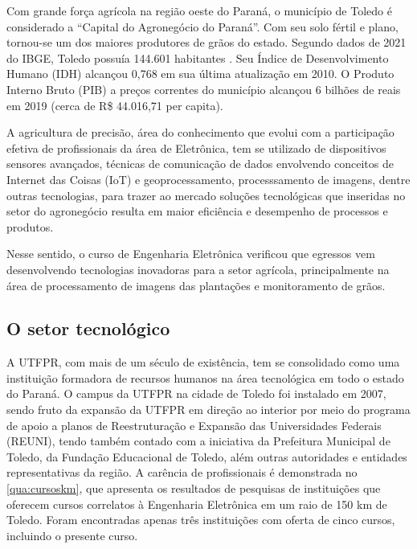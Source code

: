 Com grande força agrícola na região oeste do Paraná, o município de Toledo é considerado a ``Capital do Agronegócio do Paraná''. Com seu solo fértil e plano, tornou-se um dos maiores produtores de grãos do estado. Segundo dados de 2021 do IBGE, Toledo possuía 144.601 habitantes \cite{ibge2020}. Seu Índice de Desenvolvimento Humano (IDH) alcançou 0,768 em sua última atualização em 2010. O Produto Interno Bruto (PIB) a preços correntes do município alcançou 6 bilhões de reais em 2019 (cerca de R\$ 44.016,71 per capita). 


A agricultura de precisão, área do conhecimento que evolui com a participação efetiva de profissionais da área de Eletrônica, tem se utilizado de dispositivos sensores avançados, técnicas de comunicação de dados envolvendo conceitos de Internet das Coisas (IoT) e geoprocessamento, processsamento de imagens, dentre outras tecnologias, para trazer ao mercado soluções tecnológicas que inseridas no setor do agronegócio resulta em maior eficiência e desempenho de processos e produtos. 

Nesse sentido, o curso de Engenharia Eletrônica verificou que egressos vem desenvolvendo tecnologias inovadoras para a setor agrícola, principalmente na área de processamento de imagens das plantações e monitoramento de grãos.

\subsection{O setor tecnológico}

A UTFPR, com mais de um século de existência, tem se consolidado como uma instituição formadora de recursos humanos na área tecnológica em todo o estado do Paraná. O campus da UTFPR na cidade de Toledo foi instalado em 2007, sendo fruto da expansão da UTFPR em direção ao interior por meio do programa de apoio a planos de Reestruturação e Expansão das Universidades Federais (REUNI), tendo também contado com a iniciativa da Prefeitura Municipal de Toledo, da Fundação Educacional de Toledo, além outras autoridades e entidades representativas da região. A carência de profissionais é demonstrada no \autoref{qua:cursoskm}, que apresenta os resultados de pesquisas de instituições que oferecem cursos correlatos à Engenharia Eletrônica em um raio de 150 km de Toledo. Foram encontradas apenas três instituições com oferta de cinco cursos, incluindo o presente curso.

